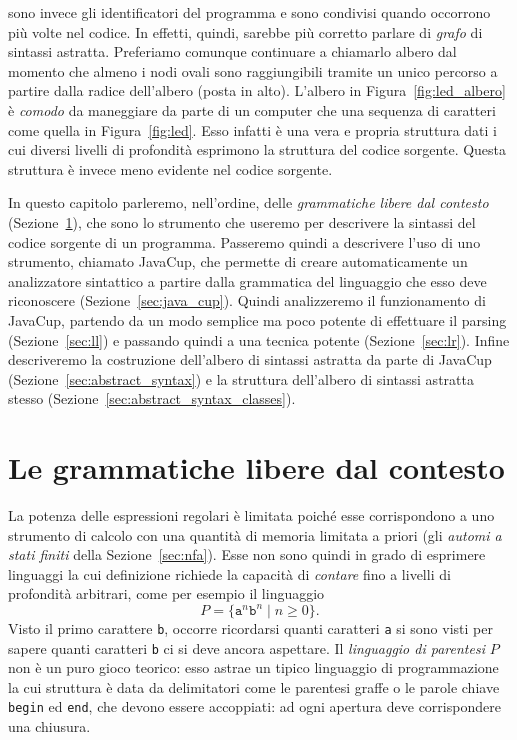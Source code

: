 sono invece gli identificatori del programma e sono condivisi quando
occorrono pi\`u volte nel codice. In effetti, quindi, sarebbe pi\`u
corretto parlare di \emph{grafo} di sintassi astratta. Preferiamo comunque
continuare a chiamarlo albero dal momento che almeno
i nodi ovali sono raggiungibili tramite
un unico percorso a partire dalla radice dell'albero (posta in alto).
L'albero in Figura~\ref{fig:led_albero} \`e \piu \emph{comodo} da
maneggiare da parte di un computer che una sequenza di caratteri come
quella in Figura~\ref{fig:led}. Esso infatti \`e una vera e propria
struttura dati i cui diversi livelli di profondit\`a esprimono
la struttura del codice sorgente. Questa struttura \`e invece
meno evidente nel codice sorgente.

In questo capitolo parleremo, nell'ordine, delle \emph{grammatiche libere
dal contesto} (Sezione~\ref{sec:grammar}), che sono lo strumento che useremo
per descrivere la sintassi del codice sorgente di un programma.
Passeremo quindi a descrivere l'uso di uno strumento,
chiamato JavaCup, che permette di creare automaticamente
un analizzatore sintattico a partire dalla grammatica del linguaggio
che esso deve riconoscere (Sezione~\ref{sec:java_cup}).
Quindi analizzeremo il funzionamento di JavaCup, partendo
da un modo semplice ma poco potente di effettuare il parsing
(Sezione~\ref{sec:ll}) e passando quindi a una tecnica \piu
potente (Sezione~\ref{sec:lr}). Infine descriveremo la costruzione
dell'albero di sintassi astratta da parte di JavaCup
(Sezione~\ref{sec:abstract_syntax}) e la struttura dell'albero
di sintassi astratta stesso (Sezione~\ref{sec:abstract_syntax_classes}).
%
\section{Le grammatiche libere dal contesto}\label{sec:grammar}
%
La potenza delle espressioni regolari \`e limitata poich\'e esse
corrispondono a uno strumento di calcolo con una quantit\`a di memoria
limitata a priori (gli \emph{automi a stati finiti} della
Sezione~\ref{sec:nfa}). Esse non sono quindi in grado di esprimere
linguaggi la cui definizione richiede la capacit\`a di \emph{contare}
fino a livelli di profondit\`a arbitrari, come per esempio il linguaggio
%
\[
  P=\{\mathtt{a}^n\mathtt{b}^n\mid n\ge 0\}.
\]
Visto il primo carattere \texttt{b}, occorre ricordarsi quanti caratteri
\texttt{a} si sono visti per sapere quanti caratteri \texttt{b}
ci si deve ancora aspettare. Il \emph{linguaggio di parentesi} $P$ non \`e
un puro gioco teorico: esso astrae un tipico linguaggio di programmazione
la cui struttura \`e data da delimitatori come le parentesi graffe
o le parole chiave \texttt{begin} ed \texttt{end}, che devono essere
accoppiati: ad ogni apertura deve corrispondere una chiusura.

